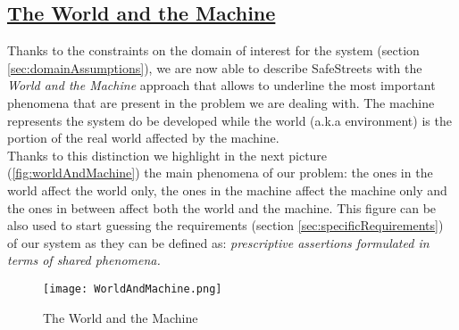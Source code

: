 \subsection[The World and the Machine]{\hyperlink{toc}{The World and the Machine}}
	\label{sec:worldMachine}
	Thanks to the constraints on the domain of interest for the system (section \ref{sec:domainAssumptions}), we are now able to describe SafeStreets with the \textit{World and the Machine} approach that allows to underline the most important phenomena that are present in the problem we are dealing with. The machine represents the system do be developed while the world (a.k.a environment) is the portion of the real world affected by the machine.\\
	
	Thanks to this distinction we highlight in the next picture (\autoref{fig:worldAndMachine}) the main phenomena of our problem: the ones in the world affect the world only, the ones in the machine affect the machine only and the ones in between affect both the world and the machine. This figure can be also used to start guessing the requirements (section \ref{sec:specificRequirements}) of our system as they can be defined as: \textit{prescriptive assertions formulated in terms of shared phenomena.}
	\vspace{1cm} 
	
	\begin{figure}[h]
		\centering
		\texttt{[image: WorldAndMachine.png]}
		\caption{\label{fig:worldAndMachine}The World and the Machine}
	\end{figure}
 	 